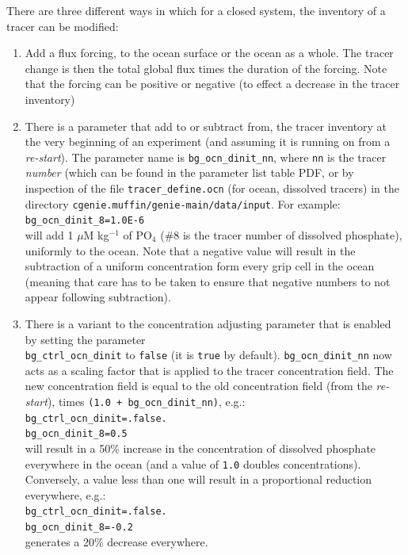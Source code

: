 \documentclass[11pt,fleqn]{book} %
\begin{document}
There are three different ways in which for a closed system, the inventory of a tracer can be modified:

\begin{enumerate}[noitemsep]

\vspace{1mm}
\item Add a flux forcing, to the ocean surface or the ocean as a whole. The tracer change is then the total global flux times the duration of the forcing. Note that the forcing can be positive or negative (to effect a decrease in the tracer inventory)

\vspace{1mm}
\item There is a parameter that add to or subtract from, the tracer inventory at the very beginning of an experiment (and assuming it is running on from a \textit{re-start}). The parameter name is \texttt{bg\_ocn\_dinit\_nn}, where \texttt{nn} is the tracer \textit{number} (which can be found in the parameter list table PDF, or by inspection of the file \texttt{tracer\_define.ocn} (for ocean, dissolved tracers) in the directory \texttt{cgenie.muffin/genie-main/data/input}. For example:
\\\texttt{bg\_ocn\_dinit\_8=1.0E-6}
\\will add 1 \(\mu\)M kg\(^{-1}\) of PO\(_{4}\) (\#8 is the tracer number of dissolved phosphate), uniformly to the ocean.
Note that a negative value will result in the subtraction of a uniform concentration form every grip cell in the ocean (meaning that care has to be taken to ensure that negative numbers to not appear following subtraction).

\vspace{1mm}
\item There is a variant to the concentration adjusting parameter that is enabled by setting the parameter
\\ \texttt{bg\_ctrl\_ocn\_dinit} to \texttt{false} (it is \texttt{true} by default). \texttt{bg\_ocn\_dinit\_nn} now acts as a scaling factor that is applied to the tracer concentration field. The new concentration field is equal to the old concentration field (from the \textit{re-start}), times \texttt{(1.0 + bg\_ocn\_dinit\_nn)}, e.g.:
\\\texttt{bg\_ctrl\_ocn\_dinit=.false.}
\\\texttt{bg\_ocn\_dinit\_8=0.5}
\\will result in a 50\% increase in the concentration of dissolved phosphate   everywhere in the ocean (and a value of \texttt{1.0} doubles  concentrations). Conversely, a value less than one will result in a proportional reduction everywhere, e.g.:
\\\texttt{bg\_ctrl\_ocn\_dinit=.false.}
\\\texttt{bg\_ocn\_dinit\_8=-0.2}
\\generates a 20\% decrease everywhere.

\end{enumerate}
\end{document}
